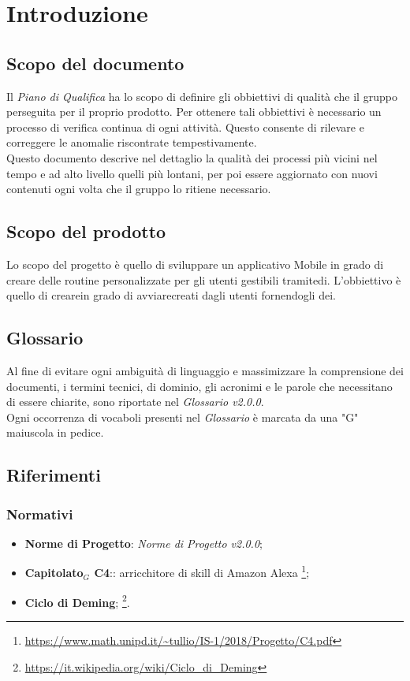 \chapter{Introduzione}
\label{introduzione}
\section{Scopo del documento}
Il \textit{Piano di Qualifica} ha lo scopo di definire gli obbiettivi di qualità che il gruppo perseguita per il proprio prodotto. Per ottenere tali obbiettivi è necessario un processo di verifica continua di ogni attività. Questo consente di rilevare e correggere le anomalie riscontrate tempestivamente.\\
Questo documento descrive nel dettaglio la qualità dei processi più vicini nel tempo e ad alto livello quelli più lontani, per poi essere aggiornato con nuovi contenuti ogni volta che il gruppo lo ritiene necessario.
\section{Scopo del prodotto}
Lo scopo del progetto è quello di sviluppare un applicativo Mobile in grado di creare delle routine personalizzate per gli utenti gestibili tramitedi. L'obbiettivo è quello di crearein grado di avviarecreati dagli utenti fornendogli dei.
\section{Glossario}
Al fine di evitare ogni ambiguità di linguaggio e massimizzare la comprensione dei documenti, i termini tecnici, di dominio, gli acronimi e le parole che necessitano di essere chiarite, sono riportate nel \textit{Glossario v2.0.0}.\\
Ogni occorrenza di vocaboli presenti nel \textit{Glossario} è marcata da una "G" maiuscola in pedice.
\section{Riferimenti}
\subsection{Normativi}
\begin{itemize}
	\item  \textbf{Norme di Progetto}: \textit{Norme di Progetto v2.0.0};
	\item \textbf{Capitolato$_{G}$ C4}:: arricchitore di skill di Amazon Alexa	\footnote{\url{https://www.math.unipd.it/~tullio/IS-1/2018/Progetto/C4.pdf}};
	\item \textbf{Ciclo di Deming};
	\footnote{\url{https://it.wikipedia.org/wiki/Ciclo_di_Deming}}.
\end{itemize}
